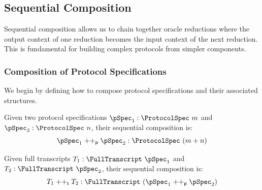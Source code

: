 



\subsection{Sequential Composition}\label{sec:sequential_composition}

Sequential composition allows us to chain together oracle reductions where the output context of one reduction becomes the input context of the next reduction. This is fundamental for building complex protocols from simpler components.

\subsubsection{Composition of Protocol Specifications}

We begin by defining how to compose protocol specifications and their associated structures.

\begin{definition}
    \label{def:protocol_spec_append}
    Given two protocol specifications $\pSpec_1 : \ProtocolSpec\ m$ and $\pSpec_2 : \ProtocolSpec\ n$, their sequential composition is:
    \[ \pSpec_1 \mathrel{++_\mathsf{p}} \pSpec_2 : \ProtocolSpec\ (m + n) \]
\end{definition}

\begin{definition}
    \label{def:transcript_append}
    Given full transcripts $T_1 : \FullTranscript\ \pSpec_1$ and $T_2 : \FullTranscript\ \pSpec_2$, their sequential composition is:
    \[ T_1 \mathrel{++_\mathsf{t}} T_2 : \FullTranscript\ (\pSpec_1 \mathrel{++_\mathsf{p}} \pSpec_2) \]
\end{definition}

